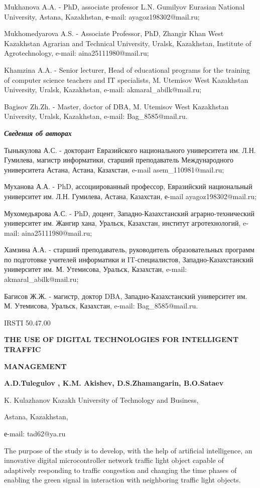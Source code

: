 Mukhanova A.A. - PhD, associate professor L.N. Gumilyov Eurasian
National University, Astana, Kazakhstan, е-mail: ayagoz198302@mail.ru;

Mukhomedyarova A.S. - Associate Professor, PhD, Zhangir Khan West
Kazakhstan Agrarian and Technical University, Uralsk, Kazakhstan,
Institute of Agrotechnology, e-mail: aina25111980@mail.ru;

Khamzina A.A. - Senior lecturer, Head of educational programs for the
training of computer science teachers and IT specialists, M. Utemisov
West Kazakhstan University, Uralsk, Kazakhstan, e-mail:
akmaral\_abilk@mail.ru;

Bagisov Zh.Zh. - Master, doctor of DBA, M. Utemisov West Kazakhstan
University, Uralsk, Kazakhstan, e-mail: Bag\_8585@mail.ru.

\emph{\textbf{Сведения об авторах}}

Тыныкулова А.С. - докторант Евразийского национального университета им.
Л.Н. Гумилева, магистр информатики, старший преподаватель Международного
университета Астана, Астана, Казахстан, e-mail asem\_110981@mail.ru;

Муханова А.А. - PhD, ассоциированный профессор, Евразийский национальный
университет им. Л.Н. Гумилева, Астана, Казахстан, е-mail
ayagoz198302@mail.ru;

Мухомедьярова А.С. - PhD, доцент, Западно-Казахстанский
аграрно-технический университет им. Жангир хана, Уральск, Казахстан,
институт агротехнологий, e-mail: aina25111980@mail.ru;

Хамзина А.А. - старший преподаватель, руководитель образовательных
программ по подготовке учителей информатики и IT-специалистов,
Западно-Казахстанский университет им. М. Утемисова, Уральск, Казахстан,
e-mail: akmaral\_abilk@mail.ru;

Багисов Ж.Ж. - магистр, доктор DBA, Западно-Казахстанский университет
им. М. Утемисова, Уральск, Казахстан, e-mail: Bag\_8585@mail.ru.

IRSTI 50.47.00

\textbf{THE USE OF DIGITAL TECHNOLOGIES FOR INTELLIGENT TRAFFIC}

\textbf{MANAGEMENT}

\textbf{A.D.Tulegulov , K.M. Akishev, D.S.Zhamangarin, B.O.Sataev}

K. Kulazhanov Kazakh University of Technology and Business,

Astana, Kazakhstan,

е-mail: tad62@ya.ru

The purpose of the study is to develop, with the help of artificial
intelligence, an innovative digital microcontroller network traffic
light object capable of adaptively responding to traffic congestion and
changing the time phases of enabling the green signal in interaction
with neighboring traffic light objects.

